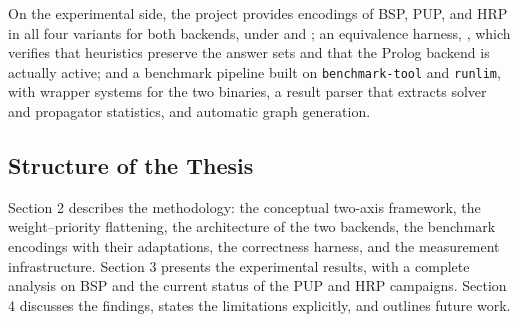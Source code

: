 On the experimental side, the project provides encodings of BSP, PUP, and HRP in all four variants for both backends, under  and ; an equivalence harness, , which verifies that heuristics preserve the answer sets and that the Prolog backend is actually active; and a benchmark pipeline built on \texttt{benchmark-tool} and \texttt{runlim}, with wrapper systems for the two binaries, a result parser that extracts solver and propagator statistics, and automatic graph generation.

\subsection{Structure of the Thesis}

Section 2 describes the methodology: the conceptual two-axis framework, the weight--priority flattening, the architecture of the two backends, the benchmark encodings with their adaptations, the correctness harness, and the measurement infrastructure. Section 3 presents the experimental results, with a complete analysis on BSP and the current status of the PUP and HRP campaigns. Section 4 discusses the findings, states the limitations explicitly, and outlines future work.
